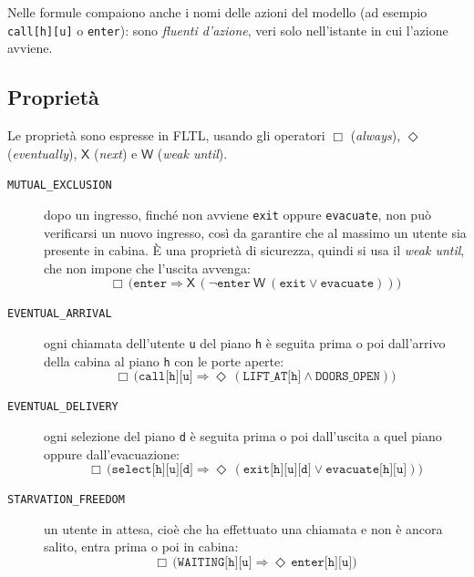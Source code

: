 Nelle formule compaiono anche i nomi delle azioni del modello (ad esempio \texttt{call[h][u]} o \texttt{enter}): sono \emph{fluenti d'azione}, veri solo nell'istante in cui l'azione avviene.

\subsection{Proprietà}
Le proprietà sono espresse in FLTL, usando gli operatori $\Box$ (\emph{always}), $\Diamond$ (\emph{eventually}), $\mathsf{X}$ (\emph{next}) e $\mathsf{W}$ (\emph{weak until}).

\begin{description}
  \item[\texttt{MUTUAL\_EXCLUSION}] dopo un ingresso, finché non avviene \texttt{exit} oppure \texttt{evacuate}, non può verificarsi un nuovo ingresso, così da garantire che al massimo un utente sia presente in cabina.
    È una proprietà di sicurezza, quindi si usa il \emph{weak until}, che non impone che l'uscita avvenga:
    \[
      \Box\,\bigl(\texttt{enter} \Rightarrow
        \mathsf{X}\,(\neg\texttt{enter}\ \mathsf{W}\ (\texttt{exit}
      \lor \texttt{evacuate}))\bigr)
    \]
  \item[\texttt{EVENTUAL\_ARRIVAL}] ogni chiamata dell'utente \texttt{u} del piano \texttt{h} è seguita prima o poi dall'arrivo della cabina al piano \texttt{h} con le porte aperte:
    \[
      \Box\,\bigl(\texttt{call[h][u]} \Rightarrow
      \Diamond\,(\texttt{LIFT\_AT[h]} \land \texttt{DOORS\_OPEN})\bigr)
    \]
  \item[\texttt{EVENTUAL\_DELIVERY}] ogni selezione del piano \texttt{d} è seguita prima o poi dall'uscita a quel piano oppure dall'evacuazione:
    \[
      \Box\,\bigl(\texttt{select[h][u][d]} \Rightarrow
      \Diamond\,(\texttt{exit[h][u][d]} \lor \texttt{evacuate[h][u]})\bigr)
    \]
  \item[\texttt{STARVATION\_FREEDOM}] un utente in attesa, cioè che ha effettuato una chiamata e non è ancora salito, entra prima o poi in cabina:
    \[
      \Box\,\bigl(\texttt{WAITING[h][u]} \Rightarrow
      \Diamond\,\texttt{enter[h][u]}\bigr)
    \]
\end{description}

%
%
